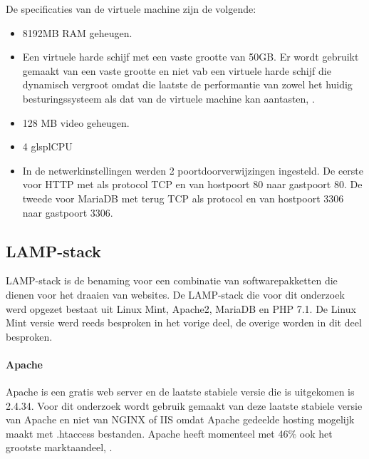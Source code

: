 De specificaties van de virtuele machine zijn de volgende:
\begin{itemize}
\item 8192MB RAM geheugen.
\item Een virtuele harde schijf met een vaste grootte van 50GB. Er wordt gebruikt gemaakt van een vaste grootte en niet vab een virtuele harde schijf die dynamisch vergroot omdat die laatste de performantie van zowel het huidig besturingssysteem als dat van de virtuele machine kan aantasten, \textcite{Sanders2006}.
\item 128 MB video geheugen.
\item 4 glspl{CPU}
\item In de netwerkinstellingen werden 2 poortdoorverwijzingen ingesteld. De eerste voor HTTP met als protocol TCP en van hostpoort 80 naar gastpoort 80. De tweede voor MariaDB met terug TCP als protocol en van hostpoort 3306 naar gastpoort 3306.
\end{itemize}

\subsection{LAMP-stack}

LAMP-stack is de benaming voor een combinatie van softwarepakketten die dienen voor het draaien van websites. De LAMP-stack die voor dit onderzoek werd opgezet bestaat uit Linux Mint, Apache2, MariaDB en PHP 7.1. De Linux Mint versie werd reeds besproken in het vorige deel, de overige worden in dit deel besproken.

\paragraph{Apache}
Apache is een gratis \gls{web server} en de laatste stabiele versie die is uitgekomen is 2.4.34. Voor dit onderzoek wordt gebruik gemaakt van deze laatste stabiele versie van Apache en niet van NGINX of IIS omdat Apache gedeelde hosting mogelijk maakt met .htaccess bestanden. Apache heeft momenteel met 46\% ook het grootste marktaandeel, \autocite{Leslie2018}.

